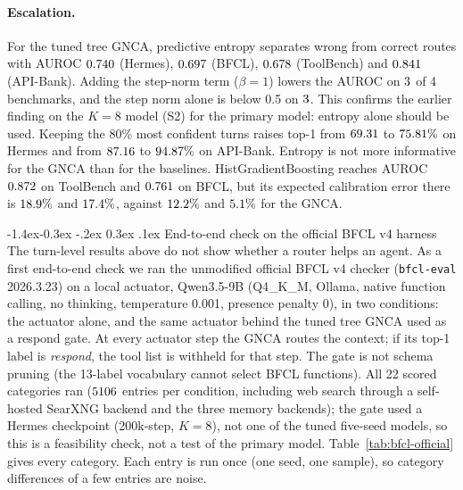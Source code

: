 \documentclass[10pt,twocolumn,letterpaper]{article}
\makeatletter
\renewcommand\subsection{\@startsection{subsection}{2}{\z@}%
  {-1.4ex\@plus -0.3ex \@minus -.2ex}%
  {0.3ex \@plus .1ex}%
  {\normalfont\normalsize\bfseries}}
\makeatother
\begin{document}
\paragraph{Escalation.} For the tuned tree GNCA, predictive entropy separates wrong from correct routes with AUROC $0.740$ (Hermes), $0.697$ (BFCL), $0.678$ (ToolBench) and $0.841$ (API-Bank). Adding the step-norm term ($\beta{=}1$) lowers the AUROC on $3$ of 4 benchmarks, and the step norm alone is below 0.5 on $3$. This confirms the earlier finding on the $K{=}8$ model (S2) for the primary model: entropy alone should be used. Keeping the 80\% most confident turns raises top-1 from $69.31$ to $75.81\%$ on Hermes and from $87.16$ to $94.87\%$ on API-Bank. Entropy is not more informative for the GNCA than for the baselines. HistGradientBoosting reaches AUROC $0.872$ on ToolBench and $0.761$ on BFCL, but its expected calibration error there is $18.9\%$ and $17.4\%$, against $12.2\%$ and $5.1\%$ for the GNCA.

\subsection{End-to-end check on the official BFCL v4 harness}\label{sec:bfcl-official}
The turn-level results above do not show whether a router helps an agent. As a first end-to-end check we ran the unmodified official BFCL v4 checker (\texttt{bfcl-eval} 2026.3.23) on a local actuator, Qwen3.5-9B (Q4\_K\_M, Ollama, native function calling, no thinking, temperature 0.001, presence penalty 0), in two conditions: the actuator alone, and the same actuator behind the tuned tree GNCA used as a respond gate. At every actuator step the GNCA routes the context; if its top-1 label is \emph{respond}, the tool list is withheld for that step. The gate is not schema pruning (the 13-label vocabulary cannot select BFCL functions). All 22 scored categories ran ($5106$ entries per condition, including web search through a self-hosted SearXNG backend and the three memory backends); the gate used a Hermes checkpoint (200k-step, $K{=}8$), not one of the tuned five-seed models, so this is a feasibility check, not a test of the primary model. Table~\ref{tab:bfcl-official} gives every category. Each entry is run once (one seed, one sample), so category differences of a few entries are noise.
\end{document}
